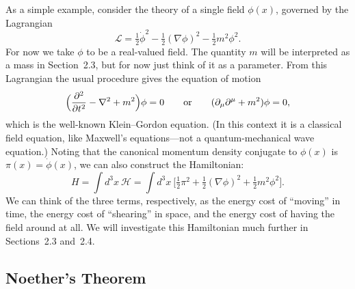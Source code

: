 As a simple example, consider the theory of a single field $\phi(x)$,
governed by the Lagrangian
\begin{equation}
  \mathcal{L} = \tfrac{1}{2}\dot{\phi}^2 - \tfrac{1}{2}(\nabla\phi)^2
    - \tfrac{1}{2}m^2\phi^2 .
  \label{eq:2.6}
\end{equation}
For now we take $\phi$ to be a real-valued field.  The quantity $m$ will
be interpreted as a mass in Section~2.3, but for now just think of it as a
parameter.  From this Lagrangian the usual procedure gives the equation of
motion
\begin{equation}
  \Bigl( \frac{\partial^2}{\partial t^2} - \nabla^2 + m^2 \Bigr)\phi = 0
  \qquad\text{or}\qquad (\partial_\mu\partial^\mu + m^2)\phi = 0,
  \label{eq:2.7}
\end{equation}
which is the well-known Klein--Gordon equation.  (In this context it is a
classical field equation, like Maxwell's equations---not a
quantum-mechanical wave equation.)  Noting that the canonical momentum
density conjugate to $\phi(x)$ is $\pi(x) = \dot{\phi}(x)$, we can also
construct the Hamiltonian:
\begin{equation}
  H = \int d^3x\ \mathcal{H}
    = \int d^3x\ \bigl[ \tfrac{1}{2}\pi^2 + \tfrac{1}{2}(\nabla\phi)^2
      + \tfrac{1}{2}m^2\phi^2 \bigr].
  \label{eq:2.8}
\end{equation}
We can think of the three terms, respectively, as the energy cost of
``moving'' in time, the energy cost of ``shearing'' in space, and the
energy cost of having the field around at all.  We will investigate this
Hamiltonian much further in Sections~2.3 and~2.4.

\subsection*{Noether's Theorem}

